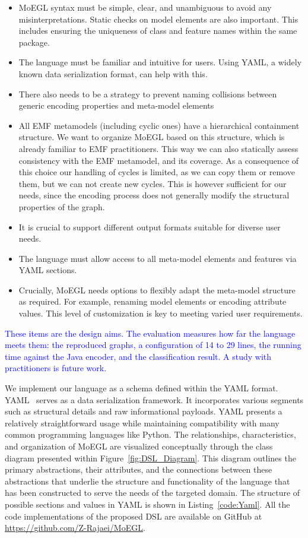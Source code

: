 \documentclass[journal,article,submit,moreauthors,technologies]{Definitions/mdpi}
\newcommand{\rev}[1]{\textcolor{blue}{#1}}
\begin{document}
\begin{itemize}
    \item MoEGL syntax must be simple, clear, and unambiguous to avoid any misinterpretations. Static checks on model elements are also important. This includes ensuring the uniqueness of class and feature names within the same package.
    \item The language must be familiar and intuitive for users. Using YAML, a widely known data serialization format, can help with this.
    \item There also needs to be a strategy to prevent naming collisions between generic encoding properties and meta-model elements
    \item All EMF metamodels (including cyclic ones) have a hierarchical containment structure. We want to organize MoEGL based on this structure, which is already familiar to EMF practitioners. This way we can also statically assess consistency with the EMF metamodel, and its coverage. As a consequence of this choice our handling of cycles is limited, as we can copy them or remove them, but we can not create new cycles. This is however sufficient for our needs, since the encoding process does not generally modify the structural properties of the graph.
    \item It is crucial to support different output formats suitable for diverse user needs.
    \item The language must allow access to all meta-model elements and features via YAML sections.
    \item Crucially, MoEGL needs options to flexibly adapt the meta-model structure as required. For example, renaming model elements or encoding attribute values. This level of customization is key to meeting varied user requirements.
\end{itemize}
\rev{These items are the design aims. The evaluation measures how far the language meets them: the reproduced graphs, a configuration of 14 to 29 lines, the running time against the Java encoder, and the classification result. A study with practitioners is future work.}

We implement our language as a schema defined within the YAML format. YAML~\cite{ben2009yaml} serves as a data serialization framework. It incorporates various segments such as structural details and raw informational payloads. YAML presents a relatively straightforward usage while maintaining compatibility with many common programming languages like Python. The relationships, characteristics, and organization of MoEGL are visualized conceptually through the class diagram presented within Figure~\ref{fig:DSL_Diagram}. This diagram outlines the primary abstractions, their attributes, and the connections between these abstractions that underlie the structure and functionality of the language that has been constructed to serve the needs of the targeted domain. The structure of possible sections and values in YAML is shown in Listing~\ref{code:Yaml}. All the code implementations of the proposed DSL are available on GitHub at \url{https://github.com/Z-Rajaei/MoEGL}.
\end{document}
